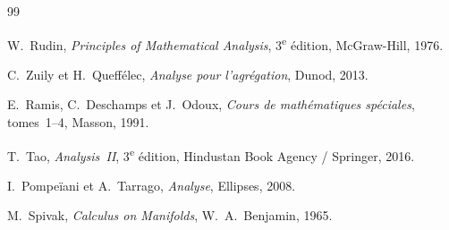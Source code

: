 \documentclass[12pt,a4paper,openany]{book}
\theoremstyle{definition}
\begin{document}
\begin{thebibliography}{99}

  W.~Rudin,
  \emph{Principles of Mathematical Analysis},
  3\textsuperscript{e} édition,
  McGraw-Hill, 1976.

  C.~Zuily et H.~Queffélec,
  \emph{Analyse pour l'agrégation},
  Dunod, 2013.

  E.~Ramis, C.~Deschamps et J.~Odoux,
  \emph{Cours de mathématiques spéciales},
  tomes~1--4,
  Masson, 1991.

  T.~Tao,
  \emph{Analysis~II},
  3\textsuperscript{e} édition,
  Hindustan Book Agency / Springer, 2016.

  I.~Pompeïani et A.~Tarrago,
  \emph{Analyse},
  Ellipses, 2008.

  M.~Spivak,
  \emph{Calculus on Manifolds},
  W.~A.~Benjamin, 1965.

\end{thebibliography}


\printindex
\end{document}
